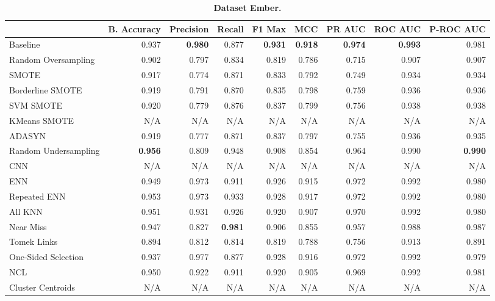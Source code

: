 \begin{table}[H]
    \centering
    \setlength\tabcolsep{2pt}
    \begin{tabularx}{\textwidth}{lRRRRRRRR}
        & B. Accuracy & Precision & Recall & F1 Max & MCC & PR AUC & ROC AUC & P-ROC AUC \\
        \midrule
        Baseline & 0.937 & \textbf{0.980} & 0.877 & \textbf{0.931} & \textbf{0.918} & \textbf{0.974} & \textbf{0.993} & 0.981 \\
        Random Oversampling & 0.902 & 0.797 & 0.834 & 0.819 & 0.786 & 0.715 & 0.907 & 0.907 \\
        SMOTE & 0.917 & 0.774 & 0.871 & 0.833 & 0.792 & 0.749 & 0.934 & 0.934 \\
        Borderline SMOTE & 0.919 & 0.791 & 0.870 & 0.835 & 0.798 & 0.759 & 0.936 & 0.936 \\
        SVM SMOTE & 0.920 & 0.779 & 0.876 & 0.837 & 0.799 & 0.756 & 0.938 & 0.938 \\
        KMeans SMOTE & N/A & N/A & N/A & N/A & N/A & N/A & N/A & N/A \\
        ADASYN & 0.919 & 0.777 & 0.871 & 0.837 & 0.797 & 0.755 & 0.936 & 0.935 \\
        Random Undersampling & \textbf{0.956} & 0.809 & 0.948 & 0.908 & 0.854 & 0.964 & 0.990 & \textbf{0.990} \\
        CNN & N/A & N/A & N/A & N/A & N/A & N/A & N/A & N/A \\
        ENN & 0.949 & 0.973 & 0.911 & 0.926 & 0.915 & 0.972 & 0.992 & 0.980 \\
        Repeated ENN & 0.953 & 0.973 & 0.933 & 0.928 & 0.917 & 0.972 & 0.992 & 0.980 \\
        All KNN & 0.951 & 0.931 & 0.926 & 0.920 & 0.907 & 0.970 & 0.992 & 0.980 \\
        Near Miss & 0.947 & 0.827 & \textbf{0.981} & 0.906 & 0.855 & 0.957 & 0.988 & 0.987 \\
        Tomek Links & 0.894 & 0.812 & 0.814 & 0.819 & 0.788 & 0.756 & 0.913 & 0.891 \\
        One-Sided Selection & 0.937 & 0.977 & 0.877 & 0.928 & 0.916 & 0.972 & 0.992 & 0.979 \\
        NCL & 0.950 & 0.922 & 0.911 & 0.920 & 0.905 & 0.969 & 0.992 & 0.981 \\
        Cluster Centroids & N/A & N/A & N/A & N/A & N/A & N/A & N/A & N/A \\
    \end{tabularx}
    \vspace{1mm}
    \caption{\textbf{Dataset Ember.}}
\end{table}
